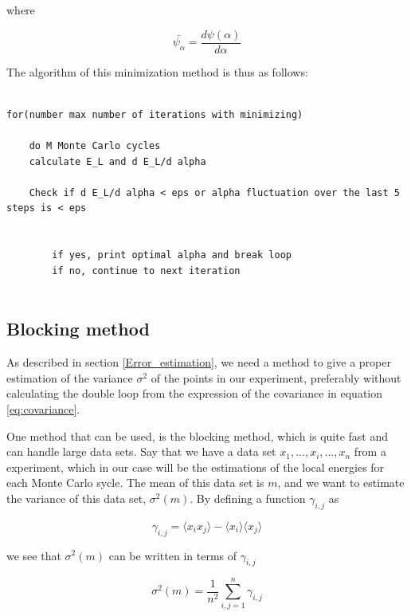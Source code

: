 \documentclass[norsk,a4paper,12pt]{article}
\begin{document}
where

\begin{equation}
	\bar{\psi_{\alpha}} = \frac{d \psi (\alpha)}{d \alpha}
\end{equation}

The algorithm of this minimization method is thus as follows:

\lstset{basicstyle=\scriptsize}
\begin{lstlisting}

for(number max number of iterations with minimizing)
	
	do M Monte Carlo cycles
	calculate E_L and d E_L/d alpha 
	
	Check if d E_L/d alpha < eps or alpha fluctuation over the last 5 steps is < eps
	
	
		if yes, print optimal alpha and break loop
		if no, continue to next iteration


\end{lstlisting}

\subsection{Blocking method}
\label{Blocking}

As described in section \ref{Error_estimation}, we need a method to give a proper estimation of the variance $\sigma^2$ of the points in our experiment, preferably without calculating the double loop from the expression of the covariance in equation \ref{eq:covariance}. 
\par 
\vspace{3mm}

One method that can be used, is the blocking method, which is quite fast and can handle large data sets. Say that we have a data set ${x_1, ...,x_i,..., x_n}$ from a experiment, which in our case will be the estimations of the local energies for each Monte Carlo sycle. The mean of this data set is $m$, and we want to estimate the variance of this data set, $\sigma^2 (m)$.  By defining a function $\gamma_{i,j}$ as 

\begin{equation}
	\gamma_{i,j} = \langle x_i x_j \rangle - \langle x_i \rangle \langle x_j \rangle
\end{equation}

we see that $\sigma^2 (m)$ can be written in terms of $\gamma_{i,j}$ 

\begin{equation}
	\sigma^2(m) = \frac{1}{n^2}\sum_{i,j = 1}^{n} \gamma_{i,j}
\end{equation}
\end{document}
